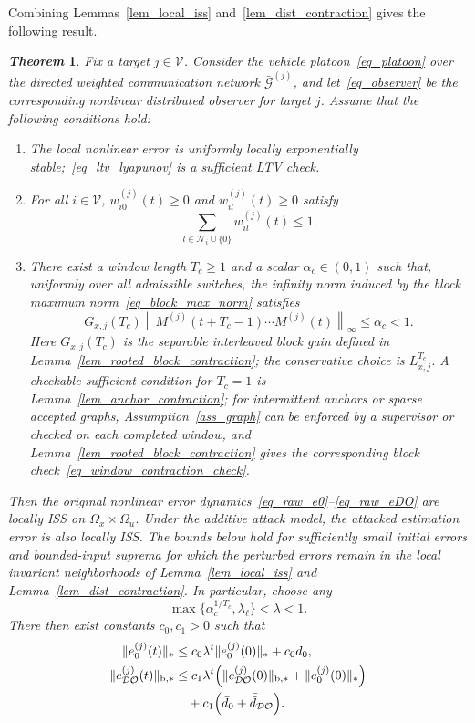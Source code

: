 \documentclass[letterpaper,journal]{IEEEtran}
\def\V{\mathcal{V}} %
\def\G{\mathcal{G}} %
\def\N{\mathcal{N}} %
\def\DO{\mathcal{DO}} %
\newtheorem{theorem}{\it Theorem}%
\begin{document}
Combining Lemmas~\ref{lem_local_iss} and~\ref{lem_dist_contraction} gives the following result.
\begin{theorem}\label{thm_observer}
Fix a target $j\in\V$. Consider the vehicle platoon~\eqref{eq_platoon} over the directed weighted communication network $\bar{\G}^{(j)}$, and let~\eqref{eq_observer} be the corresponding nonlinear distributed observer for target $j$. Assume that the following conditions hold:
\begin{enumerate}
    \item The local nonlinear error is uniformly locally exponentially stable;~\eqref{eq_ltv_lyapunov} is a sufficient LTV check.
    \item For all $i \in \V$, $w_{i0}^{(j)}(t) \geq 0$ and $w_{il}^{(j)}(t) \geq 0$ satisfy
    \begin{equation}\label{thm_W}%
    \sum_{l\in \N_i\cup\{0\}} w_{il}^{(j)}(t) \leq 1.
    \end{equation}
    \item There exist a window length $T_c\ge1$ and a scalar $\alpha_c\in(0,1)$ such that, uniformly over all admissible switches, the infinity norm induced by the block maximum norm~\eqref{eq_block_max_norm} satisfies
    \begin{equation} \label{assume3}
    G_{x,j}(T_c)
    \left\|M^{(j)}(t+T_c-1)\cdots M^{(j)}(t)\right\|_\infty
    \le \alpha_c<1.
    \end{equation}
    Here $G_{x,j}(T_c)$ is the separable interleaved block gain defined in Lemma~\ref{lem_rooted_block_contraction}; the conservative choice is $L_{x,j}^{T_c}$. A checkable sufficient condition for $T_c=1$ is Lemma~\ref{lem_anchor_contraction}; for intermittent anchors or sparse accepted graphs, Assumption~\ref{ass_graph} can be enforced by a supervisor or checked on each completed window, and Lemma~\ref{lem_rooted_block_contraction} gives the corresponding block check~\eqref{eq_window_contraction_check}.
\end{enumerate}
Then the original nonlinear error dynamics~\eqref{eq_raw_e0}--\eqref{eq_raw_eDO} are locally ISS on $\Omega_x\times\Omega_u$. Under the additive attack model, the attacked estimation error is also locally ISS. The bounds below hold for sufficiently small initial errors and bounded-input suprema for which the perturbed errors remain in the local invariant neighborhoods of Lemma~\ref{lem_local_iss} and Lemma~\ref{lem_dist_contraction}. In particular, choose any
\begin{equation}
\max\{\alpha_c^{1/T_c},\lambda_{\ell}\}<\lambda<1.
\label{eq_cascade_rate}
\end{equation}
There then exist constants $c_0,c_1>0$ such that
\begin{align}
\|e_0^{(j)}(t)\|_* &\le c_0\lambda^t \|e_0^{(j)}(0)\|_* + c_0 \bar{d}_0,\\
\|e_{\DO}^{(j)}(t)\|_{\mathrm b,*} &\le c_1\lambda^t
\Big(\|e_{\DO}^{(j)}(0)\|_{\mathrm b,*}+\|e_0^{(j)}(0)\|_*\Big)\notag\\
&\quad+c_1\Big(\bar d_0+\bar{\tilde d}_{\DO}\Big).
\end{align}

\end{theorem}
\end{document}
